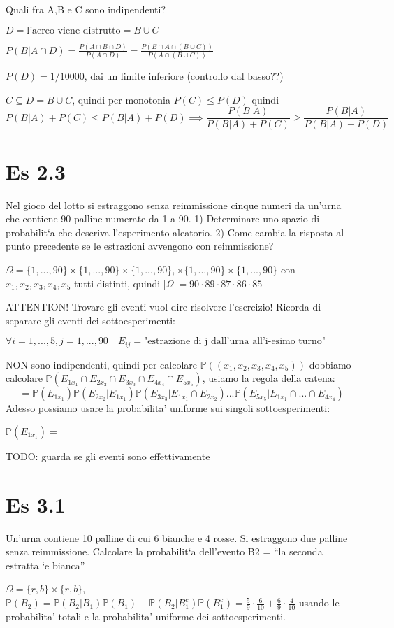 \documentclass{report}
\begin{document}
Quali fra A,B e C sono indipendenti? 

$ D = \text{l'aereo viene distrutto} = B \cup C $ 

$ P(B|A \cap D) = \frac{P(A \cap B \cap D)}{P(A \cap D)} = \frac{P(B \cap A \cap (B \cup C))}{P(A \cap (B \cup C))} $

$ P(D) = 1/10000 $, dai un limite inferiore (controllo dal basso??) 

$ C \subseteq D = B \cup C $, quindi per monotonia $ P(C) \leq P(D) $ quindi
\[
  P(B|A) + P(C) \leq P(B|A) + P(D) \implies \frac{P(B|A)}{P(B|A)+P(C)} \geq \frac{P(B|A)}{P(B|A) + P(D)}
\]


\section{Es 2.3}

Nel gioco del lotto si estraggono senza reimmissione cinque numeri da
un’urna che contiene 90 palline numerate da 1 a 90.
1) Determinare uno spazio di probabilit`a che descriva l’esperimento aleatorio.
2) Come cambia la risposta al punto precedente se le estrazioni avvengono con
reimmissione?

$ \Omega = \{1,...,90\} \times \{1,...,90\} \times \{1,...,90\}, \times \{1,...,90\} \times \{1,...,90\} $ con $ x_1,x_2,x_3,x_4,x_5 $ tutti distinti, quindi $ |\Omega| = 90 \cdot 89 \cdot 87 \cdot 86 \cdot 85 $

ATTENTION! Trovare gli eventi vuol dire risolvere l'esercizio! Ricorda di separare gli eventi dei sottoesperimenti:

$ \forall i = 1,...,5, j = 1,...,90 \quad E_{ij} = \text{"estrazione di j dall'urna all'i-esimo turno"} $

NON sono indipendenti, quindi per calcolare $ \mathbb{P}((x_1, x_2, x_3, x_4, x_5)) $ dobbiamo calcolare $ \mathbb{P}(E_{1x_1} \cap E_{2x_2} \cap E_{3x_3} \cap E_{4x_4} \cap E_{5x_5}) $, usiamo la regola della catena:
\[
  = \mathbb{P}(E_{1x_1})\mathbb{P}(E_{2x_2} | E_{1x_1})\mathbb{P}(E_{3x_3}|E_{1x_1} \cap E_{2x_2}) ... \mathbb{P}(E_{5x_5} | E_{1x_1} \cap ... \cap E_{4x_4})
\]
Adesso possiamo usare la probabilita' uniforme sui singoli sottoesperimenti:

$ \mathbb{P}(E_{1x_1}) =  $

TODO: guarda se gli eventi sono effettivamente 

\section{Es 3.1}

Un’urna contiene 10 palline di cui 6 bianche e 4 rosse. Si estraggono due
palline senza reimmissione. Calcolare la probabilit`a dell’evento
B2 = “la seconda estratta `e bianca”

$ \Omega = \{r,b\} \times \{r,b\} $, $ \mathbb{P}(B_2) = \mathbb{P}(B_2 | B_1)\mathbb{P}(B_1) + \mathbb{P}(B_2 | B_1^{c})\mathbb{P}(B_1^{c}) = \frac{5}{9} \cdot \frac{6}{10} + \frac{6}{9} \cdot \frac{4}{10} $ usando le probabilita' totali e la probabilita' uniforme dei sottoesperimenti.
\end{document}
